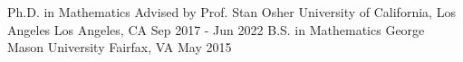 

\begin{cventries}

  \cventry
    {Ph.D. in Mathematics Advised by Prof. Stan Osher} %
    {University of California, Los Angeles} %
    {Los Angeles, CA} %
    {Sep 2017 - Jun 2022} %
    {
    }
    \vspace{-0.3cm}
  \cventry
    {B.S. in Mathematics} %
    {George Mason University} %
    {Fairfax, VA} %
    {May 2015} %
    {
    }
    
\end{cventries}
